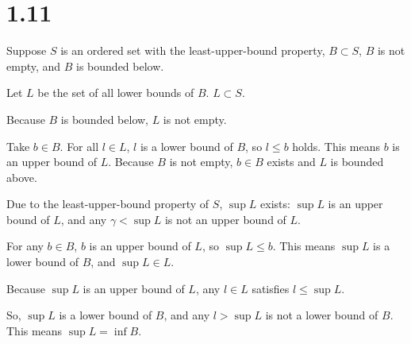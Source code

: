 \documentclass[uplatex]{jsarticle}
\begin{document}
\section{1.11}
	Suppose $S$ is an ordered set with the least-upper-bound property,
	$B \subset S$,
	$B$ is not empty,
	and $B$ is bounded below.

	Let $L$ be the set of all lower bounds of $B$. $L \subset S$.

	Because $B$ is bounded below, $L$ is not empty.

	Take $b \in B$.
	For all $l \in L$, $l$ is a lower bound of $B$,
	so $l \leq b$ holds.
	This means $b$ is an upper bound of $L$.
	Because $B$ is not empty,
	$b \in B$ exists
	and $L$ is bounded above.

	Due to the least-upper-bound property of $S$,
	$\sup L$ exists:
	$\sup L$ is an upper bound of $L$,
	and any $\gamma < \sup L$ is not an upper bound of $L$.

	For any $b \in B$,
	$b$ is an upper bound of $L$,
	so $\sup L \leq b$.
	This means $\sup L$ is a lower bound of $B$,
	and $\sup L \in L$.

	Because $\sup L$ is an upper bound of $L$,
	any $l \in L$ satisfies $l \leq \sup L$.

	So, $\sup L$ is a lower bound of $B$,
	and any $l > \sup L$ is not a lower bound of $B$.
	This means $\sup L = \inf B$.
\end{document}
